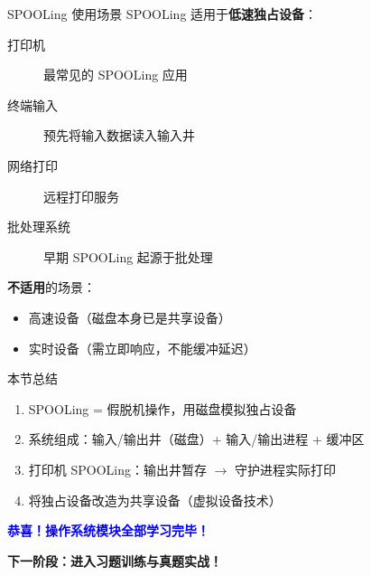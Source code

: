 \documentclass[10pt, aspectratio=169]{beamer}
\begin{document}
\begin{frame}{SPOOLing 使用场景}
    SPOOLing 适用于\textbf{低速独占设备}：
    \vspace{0.5em}
    \begin{description}
        \item[打印机] 最常见的 SPOOLing 应用
        \item[终端输入] 预先将输入数据读入输入井
        \item[网络打印] 远程打印服务
        \item[批处理系统] 早期 SPOOLing 起源于批处理
    \end{description}
    \vspace{0.5em}
    \textbf{不适用}的场景：
    \begin{itemize}
        \item 高速设备（磁盘本身已是共享设备）
        \item 实时设备（需立即响应，不能缓冲延迟）
    \end{itemize}
\end{frame}

\begin{frame}{本节总结}
    \begin{enumerate}
        \item SPOOLing = 假脱机操作，用磁盘模拟独占设备
        \item 系统组成：输入/输出井（磁盘）+ 输入/输出进程 + 缓冲区
        \item 打印机 SPOOLing：输出井暂存 $\rightarrow$ 守护进程实际打印
        \item 将独占设备改造为共享设备（虚拟设备技术）
    \end{enumerate}
    \vspace{1em}
    \begin{center}
        \textcolor{blue}{\textbf{恭喜！操作系统模块全部学习完毕！}}
    \end{center}
    \begin{center}
        \textcolor{red!80!black}{\textbf{下一阶段：进入习题训练与真题实战！}}
    \end{center}
\end{frame}
\end{document}
